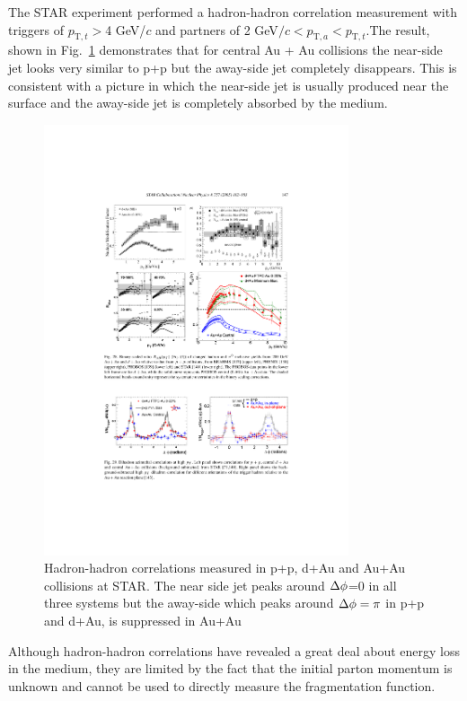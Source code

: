   The STAR experiment performed a hadron-hadron correlation measurement with triggers of $p_{\mathrm{T},t}>$4 GeV/$c$ and partners of 2 GeV$/c<p_{\mathrm{T},a}<p_{\mathrm{T},t}$.The result, shown in Fig.~\ref{fig:dihadron_correlation} demonstrates that for central Au + Au collisions the near-side jet looks very similar to p+p but the away-side jet completely disappears. This is consistent with a picture in which the near-side jet is usually produced near the surface and the away-side jet is completely absorbed by the medium.

  \begin{figure}[htpb]
    \centering
    \includegraphics[width=0.8\textwidth]{Introduction/star_dihadron.pdf}
    \caption{Hadron-hadron correlations measured in p+p, d+Au and Au+Au collisions at STAR. The near side jet peaks around $\Delta\phi$=0 in all three systems but the away-side which peaks around $\Delta\phi=\pi$ in p+p and d+Au, is suppressed in Au+Au\cite{Adams2005}}
    \label{fig:dihadron_correlation}
  \end{figure}

Although hadron-hadron correlations have revealed a great deal about energy loss in the medium, they are limited by the fact that the initial parton momentum is unknown and cannot be used to directly measure the fragmentation function.

